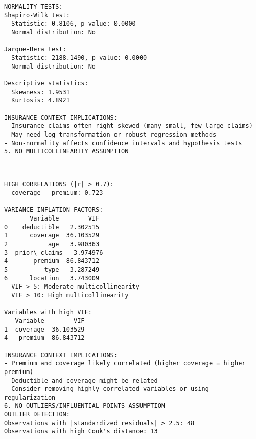 \documentclass[8pt, twocolumn]{extarticle}
\begin{document}
    \begin{Verbatim}[commandchars=\\\{\}]
NORMALITY TESTS:
Shapiro-Wilk test:
  Statistic: 0.8106, p-value: 0.0000
  Normal distribution: No

Jarque-Bera test:
  Statistic: 2188.1490, p-value: 0.0000
  Normal distribution: No

Descriptive statistics:
  Skewness: 1.9531
  Kurtosis: 4.8921

INSURANCE CONTEXT IMPLICATIONS:
- Insurance claims often right-skewed (many small, few large claims)
- May need log transformation or robust regression methods
- Non-normality affects confidence intervals and hypothesis tests
5. NO MULTICOLLINEARITY ASSUMPTION
    \end{Verbatim}

    \begin{center}
    \end{center}
    { \hspace*{\fill} \\}
    
    \begin{Verbatim}[commandchars=\\\{\}]
HIGH CORRELATIONS (|r| > 0.7):
  coverage - premium: 0.723

VARIANCE INFLATION FACTORS:
       Variable        VIF
0    deductible   2.302515
1      coverage  36.103529
2           age   3.980363
3  prior\_claims   3.974976
4       premium  86.843712
5          type   3.287249
6      location   3.743009
  VIF > 5: Moderate multicollinearity
  VIF > 10: High multicollinearity

Variables with high VIF:
   Variable        VIF
1  coverage  36.103529
4   premium  86.843712

INSURANCE CONTEXT IMPLICATIONS:
- Premium and coverage likely correlated (higher coverage = higher premium)
- Deductible and coverage might be related
- Consider removing highly correlated variables or using regularization
6. NO OUTLIERS/INFLUENTIAL POINTS ASSUMPTION
OUTLIER DETECTION:
Observations with |standardized residuals| > 2.5: 48
Observations with high Cook's distance: 13
    \end{Verbatim}

    \begin{center}
    \end{center}
    { \hspace*{\fill} \\}
    
\end{document}

